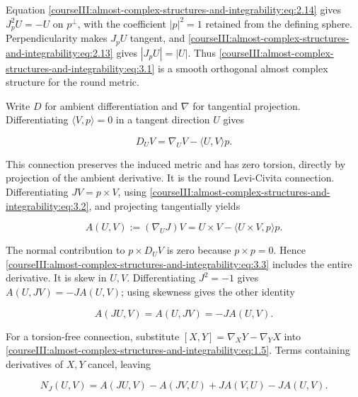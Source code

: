 Equation \eqref{courseIII:almost-complex-structures-and-integrability:eq:2.14} gives \(J_p^2U=-U\) on \(p^\perp\), with the coefficient \(|p|^2=1\) retained from the defining sphere. Perpendicularity makes \(J_pU\) tangent, and \eqref{courseIII:almost-complex-structures-and-integrability:eq:2.13} gives \(|J_pU|=|U|\). Thus \eqref{courseIII:almost-complex-structures-and-integrability:eq:3.1} is a smooth orthogonal almost complex structure for the round metric.

Write \(D\) for ambient differentiation and \(\nabla\) for tangential projection. Differentiating \(\langle V,p\rangle=0\) in a tangent direction \(U\) gives

\begin{equation}
D_UV=\nabla_UV-\langle U,V\rangle p.
\label{courseIII:almost-complex-structures-and-integrability:eq:3.2}
\end{equation}

This connection preserves the induced metric and has zero torsion, directly by projection of the ambient derivative. It is the round Levi-Civita connection. Differentiating \(JV=p\times V\), using \eqref{courseIII:almost-complex-structures-and-integrability:eq:3.2}, and projecting tangentially yields

\begin{equation}
A(U,V):=(\nabla_UJ)V
=U\times V-\langle U\times V,p\rangle p.
\label{courseIII:almost-complex-structures-and-integrability:eq:3.3}
\end{equation}

The normal contribution to \(p\times D_UV\) is zero because \(p\times p=0\). Hence \eqref{courseIII:almost-complex-structures-and-integrability:eq:3.3} includes the entire derivative. It is skew in \(U,V\). Differentiating \(J^2=-1\) gives \(A(U,JV)=-JA(U,V)\); using skewness gives the other identity

\begin{equation}
A(JU,V)=A(U,JV)=-JA(U,V).
\label{courseIII:almost-complex-structures-and-integrability:eq:3.4}
\end{equation}

For a torsion-free connection, substitute \([X,Y]=\nabla_XY-\nabla_YX\) into \eqref{courseIII:almost-complex-structures-and-integrability:eq:1.5}. Terms containing derivatives of \(X,Y\) cancel, leaving

\begin{equation}
N_J(U,V)=A(JU,V)-A(JV,U)+JA(V,U)-JA(U,V).
\label{courseIII:almost-complex-structures-and-integrability:eq:3.5}
\end{equation}

